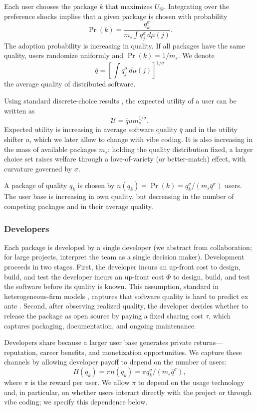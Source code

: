 \documentclass[11pt,a4paper]{article}
\theoremstyle{definition}
\theoremstyle{remark}
\begin{document}
Each user chooses the package \(k\) that maximizes \(U_{ik}\).
Integrating over the preference shocks implies that a given package is
chosen with probability \[
\Pr(k) = \frac{q_k^\sigma}{m_s\int q_j^\sigma \, d\mu(j)}.
\] The adoption probability is increasing in quality. If all packages
have the same quality, users randomize uniformly and \(\Pr(k) = 1/m_s\).
We denote \[
\bar q = \left[\int q_j^\sigma \, d\mu(j)\right]^{1/\sigma}
\] the average quality of distributed software.

Using standard discrete-choice results
\citep{anderson-depalma-thisse-1992}, the expected utility of a user can
be written as \[
\mathcal U = \bar q u m_s^{1/\sigma}.
\] Expected utility is increasing in average software quality \(\bar q\)
and in the utility shifter \(u\), which we later allow to change with
vibe coding. It is also increasing in the mass of available packages
\(m_s\): holding the quality distribution fixed, a larger choice set
raises welfare through a love-of-variety (or better-match) effect, with
curvature governed by \(\sigma\).

A package of quality \(q_k\) is chosen by
\(n(q_k) = \Pr(k) = q_k^\sigma/(m_s \bar q^\sigma)\) users. The user
base is increasing in own quality, but decreasing in the number of
competing packages and in their average quality.

\subsubsection{Developers}\label{developers}

Each package is developed by a single developer (we abstract from
collaboration; for large projects, interpret the team as a single
decision maker). Development proceeds in two stages. First, the
developer incurs an up-front cost to design, build, and test the
developer incurs an up-front cost \(\Phi\) to design, build, and test the
software before its quality is known. This assumption, standard in
heterogeneous-firm models \citep{melitz-2003}, captures that
software quality is hard to predict ex ante
\citep[page 136]{jones-2020-eseur}. Second, after observing
realized quality, the developer decides whether to release the package
as open source by paying a fixed sharing cost \(\tau\), which captures
packaging, documentation, and ongoing maintenance.

Developers share because a larger user base generates private returns---reputation, career benefits, and monetization opportunities. We capture these
channels by allowing developer payoff to depend on the
number of users: \[
\Pi(q_k) = \pi n(q_k) = \pi q_k^\sigma/(m_s \bar q^\sigma),
\] where \(\pi\) is the reward per user. We allow \(\pi\) to depend on
the usage technology and, in particular, on whether users interact
directly with the project or through vibe coding; we specify this
dependence below.
\end{document}
